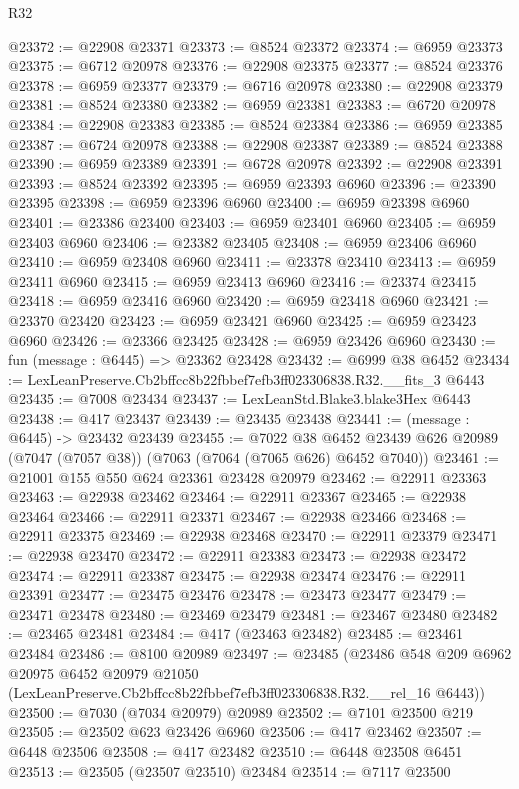 \begin{lexlean}{R32}
\begin{coremodule}
@23372 := @22908 @23371
@23373 := @8524 @23372
@23374 := @6959 @23373
@23375 := @6712 @20978
@23376 := @22908 @23375
@23377 := @8524 @23376
@23378 := @6959 @23377
@23379 := @6716 @20978
@23380 := @22908 @23379
@23381 := @8524 @23380
@23382 := @6959 @23381
@23383 := @6720 @20978
@23384 := @22908 @23383
@23385 := @8524 @23384
@23386 := @6959 @23385
@23387 := @6724 @20978
@23388 := @22908 @23387
@23389 := @8524 @23388
@23390 := @6959 @23389
@23391 := @6728 @20978
@23392 := @22908 @23391
@23393 := @8524 @23392
@23395 := @6959 @23393 @6960
@23396 := @23390 @23395
@23398 := @6959 @23396 @6960
@23400 := @6959 @23398 @6960
@23401 := @23386 @23400
@23403 := @6959 @23401 @6960
@23405 := @6959 @23403 @6960
@23406 := @23382 @23405
@23408 := @6959 @23406 @6960
@23410 := @6959 @23408 @6960
@23411 := @23378 @23410
@23413 := @6959 @23411 @6960
@23415 := @6959 @23413 @6960
@23416 := @23374 @23415
@23418 := @6959 @23416 @6960
@23420 := @6959 @23418 @6960
@23421 := @23370 @23420
@23423 := @6959 @23421 @6960
@23425 := @6959 @23423 @6960
@23426 := @23366 @23425
@23428 := @6959 @23426 @6960
@23430 := fun (message : @6445) => @23362 @23428
@23432 := @6999 @38 @6452
@23434 := LexLeanPreserve.Cb2bffcc8b22fbbef7efb3ff023306838.R32.__fits_3 @6443
@23435 := @7008 @23434
@23437 := LexLeanStd.Blake3.blake3Hex @6443
@23438 := @417 @23437
@23439 := @23435 @23438
@23441 := (message : @6445) -> @23432 @23439
@23455 := @7022
    @38
    @6452
    @23439
    @626
    @20989
    (@7047 (@7057 @38))
    (@7063 (@7064 (@7065 @626) @6452 @7040))
@23461 := @21001 @155 @550 @624 @23361 @23428 @20979
@23462 := @22911 @23363
@23463 := @22938 @23462
@23464 := @22911 @23367
@23465 := @22938 @23464
@23466 := @22911 @23371
@23467 := @22938 @23466
@23468 := @22911 @23375
@23469 := @22938 @23468
@23470 := @22911 @23379
@23471 := @22938 @23470
@23472 := @22911 @23383
@23473 := @22938 @23472
@23474 := @22911 @23387
@23475 := @22938 @23474
@23476 := @22911 @23391
@23477 := @23475 @23476
@23478 := @23473 @23477
@23479 := @23471 @23478
@23480 := @23469 @23479
@23481 := @23467 @23480
@23482 := @23465 @23481
@23484 := @417 (@23463 @23482)
@23485 := @23461 @23484
@23486 := @8100 @20989
@23497 := @23485
    (@23486
      @548
      @209
      @6962
      @20975
      @6452
      @20979
      @21050
      (LexLeanPreserve.Cb2bffcc8b22fbbef7efb3ff023306838.R32.__rel_16 @6443))
@23500 := @7030 (@7034 @20979) @20989
@23502 := @7101 @23500 @219
@23505 := @23502 @623 @23426 @6960
@23506 := @417 @23462
@23507 := @6448 @23506
@23508 := @417 @23482
@23510 := @6448 @23508 @6451
@23513 := @23505 (@23507 @23510) @23484
@23514 := @7117 @23500

\end{coremodule}
\end{lexlean}

